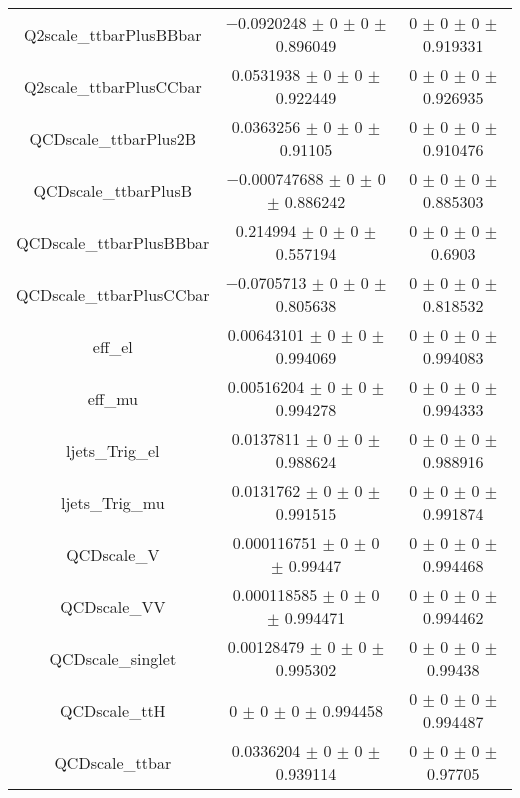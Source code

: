 \begin{table}
\begin{tabular}{ccc}
Q2scale\_ttbarPlusBBbar & \num{-0.0920248} $\pm$ \num{0} $\pm$ \num{0} $\pm$ \num{0.896049} & \num{0} $\pm$ \num{0} $\pm$ \num{0} $\pm$ \num{0.919331}\\
Q2scale\_ttbarPlusCCbar & \num{0.0531938} $\pm$ \num{0} $\pm$ \num{0} $\pm$ \num{0.922449} & \num{0} $\pm$ \num{0} $\pm$ \num{0} $\pm$ \num{0.926935}\\
QCDscale\_ttbarPlus2B & \num{0.0363256} $\pm$ \num{0} $\pm$ \num{0} $\pm$ \num{0.91105} & \num{0} $\pm$ \num{0} $\pm$ \num{0} $\pm$ \num{0.910476}\\
QCDscale\_ttbarPlusB & \num{-0.000747688} $\pm$ \num{0} $\pm$ \num{0} $\pm$ \num{0.886242} & \num{0} $\pm$ \num{0} $\pm$ \num{0} $\pm$ \num{0.885303}\\
QCDscale\_ttbarPlusBBbar & \num{0.214994} $\pm$ \num{0} $\pm$ \num{0} $\pm$ \num{0.557194} & \num{0} $\pm$ \num{0} $\pm$ \num{0} $\pm$ \num{0.6903}\\
QCDscale\_ttbarPlusCCbar & \num{-0.0705713} $\pm$ \num{0} $\pm$ \num{0} $\pm$ \num{0.805638} & \num{0} $\pm$ \num{0} $\pm$ \num{0} $\pm$ \num{0.818532}\\
eff\_el & \num{0.00643101} $\pm$ \num{0} $\pm$ \num{0} $\pm$ \num{0.994069} & \num{0} $\pm$ \num{0} $\pm$ \num{0} $\pm$ \num{0.994083}\\
eff\_mu & \num{0.00516204} $\pm$ \num{0} $\pm$ \num{0} $\pm$ \num{0.994278} & \num{0} $\pm$ \num{0} $\pm$ \num{0} $\pm$ \num{0.994333}\\
ljets\_Trig\_el & \num{0.0137811} $\pm$ \num{0} $\pm$ \num{0} $\pm$ \num{0.988624} & \num{0} $\pm$ \num{0} $\pm$ \num{0} $\pm$ \num{0.988916}\\
ljets\_Trig\_mu & \num{0.0131762} $\pm$ \num{0} $\pm$ \num{0} $\pm$ \num{0.991515} & \num{0} $\pm$ \num{0} $\pm$ \num{0} $\pm$ \num{0.991874}\\
QCDscale\_V & \num{0.000116751} $\pm$ \num{0} $\pm$ \num{0} $\pm$ \num{0.99447} & \num{0} $\pm$ \num{0} $\pm$ \num{0} $\pm$ \num{0.994468}\\
QCDscale\_VV & \num{0.000118585} $\pm$ \num{0} $\pm$ \num{0} $\pm$ \num{0.994471} & \num{0} $\pm$ \num{0} $\pm$ \num{0} $\pm$ \num{0.994462}\\
QCDscale\_singlet & \num{0.00128479} $\pm$ \num{0} $\pm$ \num{0} $\pm$ \num{0.995302} & \num{0} $\pm$ \num{0} $\pm$ \num{0} $\pm$ \num{0.99438}\\
QCDscale\_ttH & \num{0} $\pm$ \num{0} $\pm$ \num{0} $\pm$ \num{0.994458} & \num{0} $\pm$ \num{0} $\pm$ \num{0} $\pm$ \num{0.994487}\\
QCDscale\_ttbar & \num{0.0336204} $\pm$ \num{0} $\pm$ \num{0} $\pm$ \num{0.939114} & \num{0} $\pm$ \num{0} $\pm$ \num{0} $\pm$ \num{0.97705}\\

\end{tabular}
\end{table}
